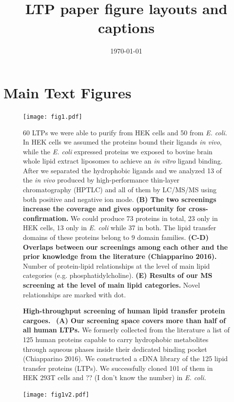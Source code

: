 \documentclass[11pt, a4paper]{article}
\title{LTP paper figure layouts and captions}
\date{\today}
\newcommand{\new}[1]{#1}
\begin{document}
    
    \section*{Main Text Figures}
    
    \begin{figure}[!h]
           \texttt{[image: fig1.pdf]}
       \caption{\label{fig:fig1}\textbf{High-throughput screening of human lipid transfer protein cargoes.} \textbullet\ \textbf{(A) Our screening space covers more than half of all human LTPs.} We formerly collected from the literature a list of 125 human proteins capable to carry hydrophobic metabolites through aqueous phases inside their dedicated binding pocket (Chiapparino 2016). We constructed a cDNA library of the 125 lipid transfer proteins (LTPs). We successfully cloned 101 of them in HEK 293T cells and ?? (\new{I don't know the number}) in \textit{E. coli.}} 60 LTPs we were able to purify from HEK cells and 50 from \textit{E. coli.} In HEK cells we assumed the proteins bound their ligands \textit{in vivo}, while the \textit{E. coli} expressed proteins we exposed to bovine brain whole lipid extract liposomes to achieve an \textit{in vitro} ligand binding. After we separated the hydrophobic ligands and we analyzed 13 of the \textit{in vivo} produced by high-performance thin-layer chromatography (HPTLC) and all of them by LC/MS/MS using both positive and negative ion mode. \textbf{(B) The two screenings increase the coverage and gives opportunity for cross-confirmation.} We could produce 73 proteins in total, 23 only in HEK cells, 13 only in \textit{E. coli} while 37 in both. The lipid transfer domains of these proteins belong to 9 domain families. \textbf{(C-D) Overlaps between our screenings among each other and the prior knowledge from the literature (Chiapparino 2016).} Number of protein-lipid relationships at the level of main lipid categories (e.g. phosphatidylcholine). \textbf{(E) Results of our MS screening at the level of main lipid categories.} Novel relationships are marked with dot.
    \end{figure}
   
    \clearpage
    \setcounter{figure}{0}
    
    \begin{figure}[p]
        \texttt{[image: fig1v2.pdf]}
    \end{figure}
    
\end{document}
